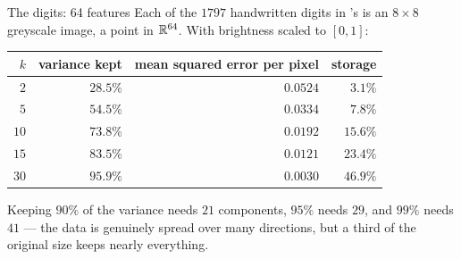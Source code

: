 \begin{workedexample}{The digits: 64 features}
Each of the $1797$ handwritten digits in 's 
is an $8\times8$ greyscale image, a point in $\mathbb{R}^{64}$. With brightness scaled to
$[0,1]$:

\begin{center}
\small
\renewcommand{\arraystretch}{1.12}
\begin{tabular}{@{}rrrr@{}}
\toprule
$k$ & variance kept & mean squared error per pixel & storage\\
\midrule
$2$  & $28.5\%$ & $0.0524$ & $3.1\%$\\
$5$  & $54.5\%$ & $0.0334$ & $7.8\%$\\
$10$ & $73.8\%$ & $0.0192$ & $15.6\%$\\
$15$ & $83.5\%$ & $0.0121$ & $23.4\%$\\
$30$ & $95.9\%$ & $0.0030$ & $46.9\%$\\
\bottomrule
\end{tabular}
\end{center}

Keeping $90\%$ of the variance needs $21$ components, $95\%$ needs $29$, and $99\%$
needs $41$ --- the data is genuinely spread over many directions, but a third of
the original size keeps nearly everything.
\end{workedexample}

